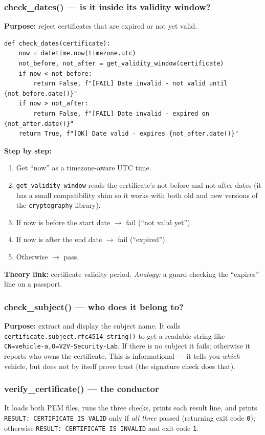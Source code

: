\documentclass[11pt,a4paper]{report}
\begin{document}
\subsubsection*{check\_dates() --- is it inside its validity window?}
\textbf{Purpose:} reject certificates that are expired or not yet valid.
\begin{lstlisting}[style=py,caption={ca/verify\_cert.py --- validity-date check.}]
def check_dates(certificate):
    now = datetime.now(timezone.utc)
    not_before, not_after = get_validity_window(certificate)
    if now < not_before:
        return False, f"[FAIL] Date invalid - not valid until {not_before.date()}"
    if now > not_after:
        return False, f"[FAIL] Date invalid - expired on {not_after.date()}"
    return True, f"[OK] Date valid - expires {not_after.date()}"
\end{lstlisting}
\textbf{Step by step:}
\begin{enumerate}
  \item Get ``now'' as a timezone-aware UTC time.
  \item \texttt{get\_validity\_window} reads the certificate's not-before and
        not-after dates (it has a small compatibility shim so it works with both
        old and new versions of the \texttt{cryptography} library).
  \item If now is before the start date $\to$ fail (``not valid yet'').
  \item If now is after the end date $\to$ fail (``expired'').
  \item Otherwise $\to$ pass.
\end{enumerate}
\textbf{Theory link:} certificate validity period. \emph{Analogy:} a guard
checking the ``expires'' line on a passport.

\subsubsection*{check\_subject() --- who does it belong to?}
\textbf{Purpose:} extract and display the subject name. It calls
\texttt{certificate.subject.rfc4514\_string()} to get a readable string like
\texttt{CN=vehicle-a,O=V2V-Security-Lab}. If there is no subject it fails;
otherwise it reports who owns the certificate. This is informational --- it tells
you \emph{which} vehicle, but does not by itself prove trust (the signature
check does that).

\subsubsection*{verify\_certificate() --- the conductor}
It loads both PEM files, runs the three checks, prints each result line, and
prints \texttt{RESULT: CERTIFICATE IS VALID} only if \emph{all three} passed
(returning exit code \texttt{0}); otherwise \texttt{RESULT: CERTIFICATE IS
INVALID} and exit code \texttt{1}.
\end{document}
